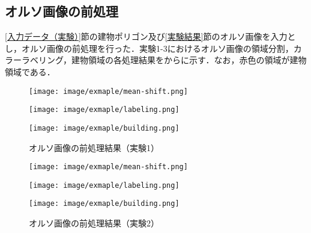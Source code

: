     \subsection*{オルソ画像の前処理}
      \ref{入力データ（実験）}節の建物ポリゴン及び\ref{実験結果}節のオルソ画像を入力とし，オルソ画像の前処理を行った．実験1-3におけるオルソ画像の領域分割，カラーラベリング，建物領域の各処理結果をからに示す．なお，赤色の領域が建物領域である．

      \begin{figure}[t]
        \begin{minipage}[c]{0.329\hsize}
          \centering
          \texttt{[image: image/exmaple/mean-shift.png]}
        \end{minipage}
        \begin{minipage}[c]{0.329\hsize}
          \centering
          \texttt{[image: image/exmaple/labeling.png]}
        \end{minipage}
        \begin{minipage}[c]{0.329\hsize}
          \centering
          \texttt{[image: image/exmaple/building.png]}
        \end{minipage}
        \caption{オルソ画像の前処理結果（実験1）}
        \label{オルソ画像の前処理結果（実験1）}
      \end{figure}

      \begin{figure}[t]
        \begin{minipage}[c]{0.329\hsize}
          \centering
          \texttt{[image: image/exmaple/mean-shift.png]}
        \end{minipage}
        \begin{minipage}[c]{0.329\hsize}
          \centering
          \texttt{[image: image/exmaple/labeling.png]}
        \end{minipage}
        \begin{minipage}[c]{0.329\hsize}
          \centering
          \texttt{[image: image/exmaple/building.png]}
        \end{minipage}
        \caption{オルソ画像の前処理結果（実験2）}      
      \end{figure}

